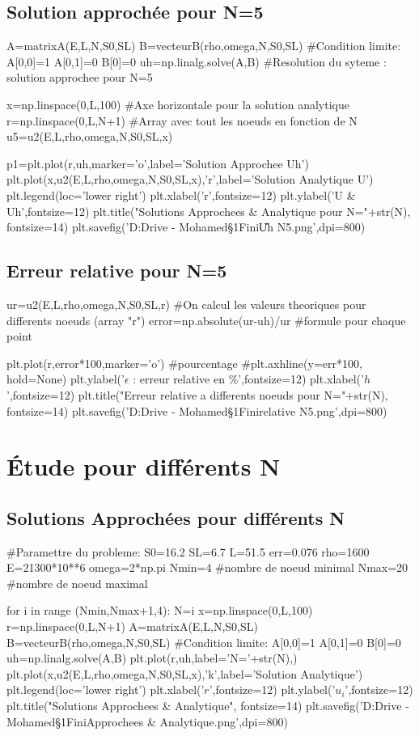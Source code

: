 \documentclass[a4paper,10pt]{report} %
\begin{document}
\subsection{Solution approchée pour N=5}
\begin{python}
A=matrixA(E,L,N,S0,SL)
B=vecteurB(rho,omega,N,S0,SL)
#Condition limite:
A[0,0]=1
A[0,1]=0
B[0]=0
uh=np.linalg.solve(A,B) #Resolution du syteme : solution approchee pour N=5

x=np.linspace(0,L,100) #Axe horizontale pour la solution analytique
r=np.linspace(0,L,N+1) #Array avec tout les noeuds en fonction de N
u5=u2(E,L,rho,omega,N,S0,SL,x)

p1=plt.plot(r,uh,marker='o',label='Solution Approchee Uh')
plt.plot(x,u2(E,L,rho,omega,N,S0,SL,x),'r',label='Solution Analytique U')
plt.legend(loc='lower right')
plt.xlabel('r',fontsize=12)
plt.ylabel('U & Uh',fontsize=12)
plt.title("Solutions Approchees & Analytique pour N="+str(N), fontsize=14)
plt.savefig('D:\Google Drive - Mohamed\Cours\S1\Element Fini\U Uh N5.png',dpi=800)
\end{python}
\subsection{Erreur relative pour N=5}
\begin{python}
ur=u2(E,L,rho,omega,N,S0,SL,r) #On calcul les valeurs theoriques pour differents noeuds (array "r")
error=np.absolute(ur-uh)/ur #formule pour chaque point

plt.plot(r,error*100,marker='o') #pourcentage
#plt.axhline(y=err*100, hold=None)
plt.ylabel('$\epsilon$ : erreur relative en $\%$',fontsize=12)
plt.xlabel('$h$',fontsize=12)
plt.title("Erreur relative a differents noeuds pour N="+str(N), fontsize=14)
plt.savefig('D:\Google Drive - Mohamed\Cours\S1\Element Fini\Erreur relative N5.png',dpi=800) 
\end{python}
\section{Étude pour différents N}
\subsection{Solutions Approchées pour différents N}
\begin{python}
#Paramettre du probleme:
S0=16.2
SL=6.7
L=51.5
err=0.076
rho=1600
E=21300*10**6
omega=2*np.pi
Nmin=4 #nombre de noeud minimal
Nmax=20 #nombre de noeud maximal

for i in range (Nmin,Nmax+1,4):
    N=i
    x=np.linspace(0,L,100)
    r=np.linspace(0,L,N+1)
    A=matrixA(E,L,N,S0,SL)
    B=vecteurB(rho,omega,N,S0,SL)
    #Condition limite:
    A[0,0]=1
    A[0,1]=0
    B[0]=0
    uh=np.linalg.solve(A,B)
    plt.plot(r,uh,label='N='+str(N),)
plt.plot(x,u2(E,L,rho,omega,N,S0,SL,x),'k',label='Solution Analytique')
plt.legend(loc='lower right')
plt.xlabel('$r$',fontsize=12)
plt.ylabel('$u_{i}$',fontsize=12)
plt.title("Solutions Approchees & Analytique", fontsize=14)
plt.savefig('D:\Google Drive - Mohamed\Cours\S1\Element Fini\Solutions Approchees & Analytique.png',dpi=800)
\end{python}
\end{document}
